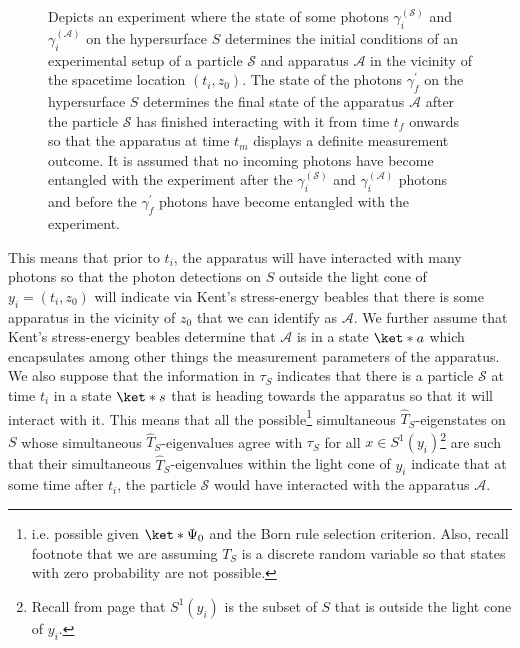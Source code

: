 \documentclass[12pt]{report}
\begin{document}
\begin{figure}[ht!]
	\vspace*{2px}
	\caption[Toy model where photon detection determines measurement choice]{Depicts an experiment where the state of some photons $\gamma_i^{(\mathcal{S})}$ and $\gamma_i^{(\mathcal{A})}$ on the hypersurface $S$ determines the initial conditions of an experimental setup of a particle $\mathcal{S}$ and apparatus $\mathcal{A}$ in the vicinity of the spacetime location $( t_i, z_0)$.  The state of the photons $\gamma_f^{\prime}$ on the hypersurface $S$ determines the final state of the apparatus $\mathcal{A}$ after the particle $ \mathcal{S}$ has finished interacting with it from time $t_f$ onwards so that the apparatus at time $t_m$	displays a definite measurement outcome. It is assumed that no incoming photons have become entangled with the experiment after the $\gamma_i^{(\mathcal{S})}$ and $\gamma_i^{(\mathcal{A})}$ photons and before the $\gamma_f^{\prime}$ photons have become entangled with the experiment.  }
	\label{pisolution}
	\end{figure}
This means that prior to $t_i$, the apparatus will have interacted with many photons so that the photon detections on $S$ outside the light cone of $y_i=(t_i, z_0)$ %
%
 will indicate via Kent's stress-energy beables that there is some apparatus in the vicinity of $z_0$ that we can identify as $\mathcal{A}$. We further assume that Kent's stress-energy beables determine that $\mathcal{A}$ is in a state $\ket*{a}$ %
%
which encapsulates among other things the measurement parameters of the apparatus.  We also suppose that the information in $\tau_S$ indicates that there is a particle $\mathcal{S}$ at time $t_i$ in a state
$\ket*{s}$ %
%
 that is heading towards the apparatus so that it will interact with it. This means that all the 
possible\footnote{i.e. possible given $\ket*{\Psi_0}$ and the Born rule selection criterion. Also, recall footnote  that we are assuming $T_S$ is a discrete random variable so that states with zero probability are not possible.} 
simultaneous $\hat{T}_S$-eigenstates on $S$ whose simultaneous $\hat{T}_S$-eigenvalues agree with $\tau_S$ for all $x\in S^1(y_i)$\footnote{Recall from page \pageref{S2} that $S^1(y_i)$ is the subset of $S$ that is outside the light cone of $y_i$.} 
 are such that their simultaneous $\hat{T}_S$-eigenvalues within the light cone of $y_i$ indicate that at some time after $t_i$, the particle $\mathcal{S}$ would have interacted
with the apparatus $\mathcal{A}$. 
\end{document}
